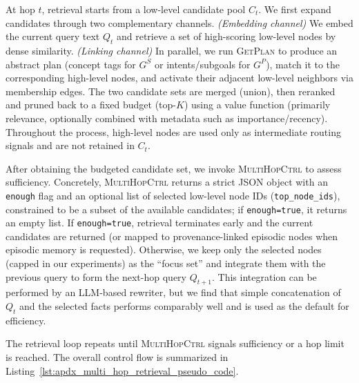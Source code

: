 {At hop $t$, retrieval starts from a low-level candidate pool $C_t$.
We first expand candidates through two complementary channels.
\emph{(Embedding channel)} We embed the current query text $Q_t$ and retrieve a set of high-scoring low-level nodes by dense similarity.
\emph{(Linking channel)} In parallel, we run \textsc{GetPlan} to produce an abstract plan (concept tags for $G^{S}$ or intents/subgoals for $G^{P}$), match it to the corresponding high-level nodes, and activate their adjacent low-level neighbors via membership edges.
The two candidate sets are merged (union), then reranked and pruned back to a fixed budget (top-$K$) using a value function (primarily relevance, optionally combined with metadata such as importance/recency).
Throughout the process, high-level nodes are used only as intermediate routing signals and are not retained in $C_t$.



After obtaining the budgeted candidate set, we invoke \textsc{MultiHopCtrl} to assess sufficiency.
Concretely, \textsc{MultiHopCtrl} returns a strict JSON object with an \texttt{enough} flag and an optional list of selected low-level node IDs (\texttt{top\_node\_ids}), constrained to be a subset of the available candidates; if \texttt{enough=true}, it returns an empty list.
If \texttt{enough=true}, retrieval terminates early and the current candidates are returned (or mapped to provenance-linked episodic nodes when episodic memory is requested).
Otherwise, we keep only the selected nodes (capped in our experiments) as the ``focus set'' and integrate them with the previous query to form the next-hop query $Q_{t+1}$.
This integration can be performed by an LLM-based rewriter, but we find that simple concatenation of $Q_t$ and the selected facts performs comparably well and is used as the default for efficiency.


The retrieval loop repeats until \textsc{MultiHopCtrl} signals sufficiency or a hop limit is reached.
The overall control flow is summarized in Listing~\ref{lst:apdx_multi_hop_retrieval_pseudo_code}.












}
